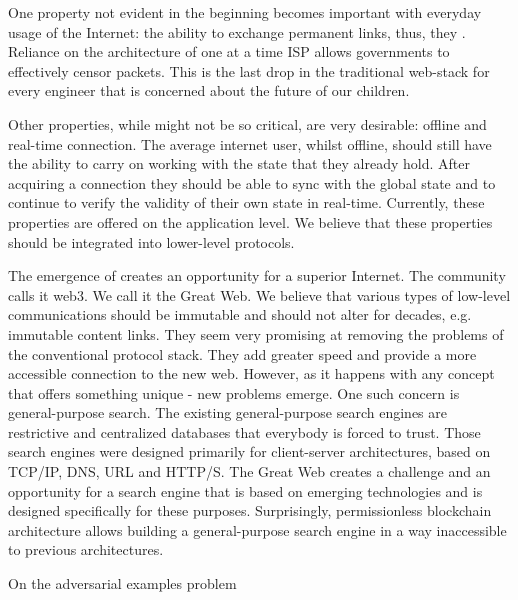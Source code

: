 \documentclass[8pt,oneside]{amsart}
\makeatletter
\newcommand{\linkgreen}[2]{\href{#1}{\color{green}{#2}}}
\renewcommand\subsection{\@startsection{subsection}
                                    {2}{\z@}
                                    {-3.25ex\@plus -1ex \@minus -.2ex}
                                    {0ex \@plus .2ex}
                                    {\play\Large}
                        }
\newcommand{\titleSection}[1]{\subsection{#1}}
\makeatother
\begin{document}
One property not evident in the beginning becomes important with everyday usage of the Internet: the ability to exchange permanent links, thus, they \linkgreen{https://ipfs.io/ipfs/QmNhaUrhM7KcWzFYdBeyskoNyihrpHvUEBQnaddwPZigcN}{will not break after time had passed}. Reliance on the architecture of one at a time ISP allows governments to effectively censor packets. This is the last drop in the traditional web-stack for every engineer that is concerned about the future of our children.

Other properties, while might not be so critical, are very desirable: offline and real-time connection. The average internet user, whilst offline, should still have the ability to carry on working with the state that they already hold. After acquiring a connection they should be able to sync with the global state and to continue to verify the validity of their own state in real-time. Currently, these properties are offered on the application level. We believe that these properties should be integrated into lower-level protocols.

The emergence of \linkgreen{https://ipfs.io/ipfs/Qmf2rKkDPSsvdudwSmdDPbZuYae8XRV26c1wAFCCvg8Dhw}{a brand-new web-stack} creates an opportunity for a superior Internet. The community calls it web3. We call it the Great Web. We believe that various types of low-level communications should be immutable and should not alter for decades, e.g. immutable content links. They seem very promising at removing the problems of the conventional protocol stack. They add greater speed and provide a more accessible connection to the new web. However, as it happens with any concept that offers something unique - new problems emerge. One such concern is general-purpose search. The existing general-purpose search engines are restrictive and centralized databases that everybody is forced to trust. Those search engines were designed primarily for client-server architectures, based on TCP/IP, DNS, URL and HTTP/S. The Great Web creates a challenge and an opportunity for a search engine that is based on emerging technologies and is designed specifically for these purposes. Surprisingly, permissionless blockchain architecture allows building a general-purpose search engine in a way inaccessible to previous architectures.

\titleSection{On the adversarial examples problem}\label{adversarial-examples}
\end{document}
